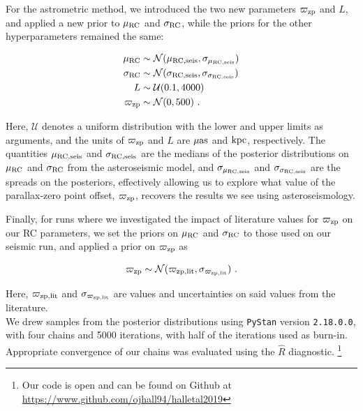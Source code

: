 \documentclass[fleqn,usenatbib]{mnras}
\newcommand{\oozp}{\mbox{$\varpi_{\rm zp}$}\xspace}
\newcommand{\murc}{\mbox{$\mu_{\rm RC}$}\xspace}
\newcommand{\sigrc}{\mbox{$\sigma_{\rm RC}$}\xspace}
\newcommand{\new}[1]{#1}
\newcommand{\nnew}[1]{#1}
\begin{document}
For the astrometric method, we introduced the two new parameters $\varpi_{\rm zp}$ and $L$, and applied a new prior to $\mu_{\rm RC}$ and \sigrc, while the priors for the other hyperparameters remained the same:

\begin{equation}\label{eq:gaiapriors}
\begin{split}
\mu_{\rm RC} &\sim \mathcal{N}(\mu_{\rm RC, seis}, \sigma_{\mu_{\rm RC, seis}})\\
\sigma_{\rm RC} &\sim \mathcal{N}(\sigma_{\rm RC, seis}, \sigma_{\sigma_{\rm RC, seis}})\\
L &\sim \mathcal{U}(0.1, 4000)\\
\oozp &\sim \mathcal{N}(0, 500)\ .\\
\end{split}
\end{equation}

\noindent Here, $\mathcal{U}$ denotes a uniform distribution with the lower and upper limits as arguments, and the units of $\varpi_{\rm zp}$ and $L$ are $\mu \rm as$ and $\rm kpc$, respectively. The quantities $\mu_{\rm RC, seis}$ and $\sigma_{\rm RC, seis}$ are the medians of the posterior distributions on $\mu_{\rm RC}$ and \sigrc from the asteroseismic model, and $\sigma_{\mu_{\rm RC, seis}}$ and $\sigma_{\sigma_{\rm RC, seis}}$ are the spreads on the posteriors, effectively allowing us to explore what value of the parallax-zero point offset, $\oozp$, recovers the results we see using asteroseismology.

\new{Finally, for runs where we investigated the impact of literature values for \oozp on our RC parameters, we set the priors on \murc and \sigrc to those used on our seismic run, and applied a prior on \oozp as}

\begin{equation} \label{eq:zeropointpriors}
\varpi_{\rm zp} \sim \mathcal{N}(\varpi_{\rm zp, lit}, \sigma_{\varpi_{\rm zp, lit}})\ .
\end{equation}

\new{\noindent Here, $\varpi_{\rm zp, lit}$ and $\sigma_{\varpi_{\rm zp, lit}}$ are values and uncertainties on said values from the literature.}\\

We drew samples from the posterior distributions using \texttt{PyStan} version \texttt{2.18.0.0}, with four chains and 5000 iterations, with half of the iterations used as burn-in. \nnew{Appropriate convergence of our chains was evaluated using the $\hat{R}$ diagnostic.} \footnote{Our code is open and can be found on Github at \url{https://www.github.com/ojhall94/halletal2019}} 
\end{document}
